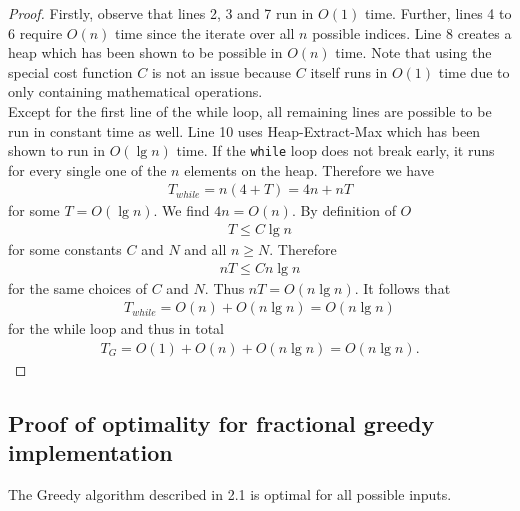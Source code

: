 \documentclass{article}
\begin{document}
\begin{proof}
    Firstly, observe that lines 2, 3 and 7 run in $O(1)$ time. Further,
    lines 4 to 6 require $O(n)$ time since the iterate over all $n$
    possible indices. Line 8 creates a heap which has been shown to be possible
    in $O(n)$ time. Note that using the special cost function $C$ is not
    an issue because $C$ itself runs in $O(1)$ time due to only containing
    mathematical operations.\\
    Except for the first line of the while loop, all remaining lines are
    possible to be run in constant time as well. Line 10 uses Heap-Extract-Max
    which has been shown to run in $O(\lg n)$ time. If the \texttt{while}
    loop does not break early, it runs for every single one of the $n$
    elements on the heap. Therefore we have
    \begin{align*}
        T_{while} = n(4+T) = 4n + nT
    \end{align*}
    for some $T=O(\lg n)$. We find $4n=O(n)$. By definition of $O$
    \begin{align*}
        T \leq C\lg n
    \end{align*}
    for some constants $C$ and $N$ and all $n\geq N$. Therefore
    \begin{align*}
        nT \leq Cn\lg n
    \end{align*}
    for the same choices of $C$ and $N$. Thus $nT=O(n\lg n)$. It follows that
    \begin{align*}
        T_{while} = O(n) + O(n\lg n) = O(n\lg n)
    \end{align*}
    for the while loop and thus in total
    \begin{align*}
        T_G = O(1) + O(n) + O(n\lg n) = O(n\lg n).
    \end{align*}
\end{proof}

\subsection{Proof of optimality for fractional greedy implementation}

\begin{claim}
    The Greedy algorithm described in 2.1 is optimal for all possible inputs.
\end{claim}
\end{document}
